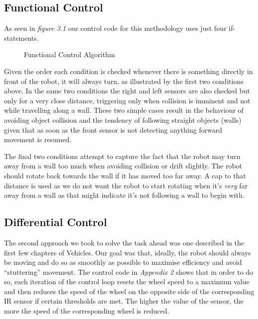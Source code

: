 \documentclass[paper=a4, fontsize=12pt]{scrartcl}	%
\numberwithin{equation}{section}		%
\numberwithin{figure}{section}			%
\numberwithin{table}{section}				%
\begin{document}
\subsection{Functional Control}
As seen in \emph{figure 3.1} our control code for this methodology uses just four if-statements.

\begin{figure}[!ht]
\begin{framed}
\begin{algorithmic}
 \ENDIF
 \ENDIF
 \ENDIF
 \ENDIF
\end{algorithmic}
\end{framed}
\caption{Functional Control Algorithm}
\end{figure}

Given the order each condition is checked whenever there is something directly in front of the robot, it will always turn, as illustrated by the first two conditions above. In the same two conditions the right and left sensors are also checked but only for a very close distance, triggering only when collision is imminent and not while travelling along a wall. These two simple cases result in the behaviour of avoiding object collision and the tendency of following straight objects (walls) given that as soon as the front sensor is not detecting anything forward movement is resumed.

The final two conditions attempt to capture the fact that the robot may turn away from a wall too much when avoiding collision or drift slightly. The robot should rotate back towards the wall if it has moved too far away. A cap to that distance is used as we do not want the robot to start rotating when it's \emph{very} far away from a wall as that might indicate it's not following a wall to begin with.
\subsection{Differential Control}
The second approach we took to solve the task ahead was one described in the first few chapters of Vehicles\cite{vehicles}. Our goal was that, ideally, the robot should always be moving and do so as smoothly as possible to maximise efficiency and avoid ``stuttering'' movement. The control code in \emph{Appendix 2} shows that in order to do so, each iteration of the control loop resets the wheel speed to a maximum value and then reduces the speed of the wheel on the opposite side of the corresponding IR sensor if certain thresholds are met. The higher the value of the sensor, the more the speed of the corresponding wheel is reduced.
\end{document}
